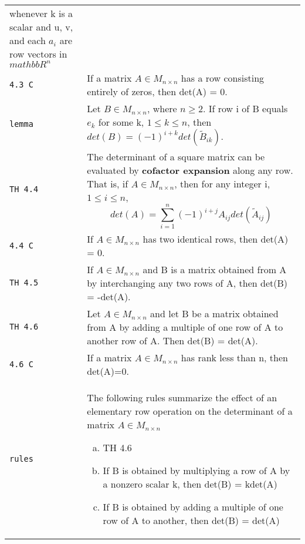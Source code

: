 \documentclass[10pt,landscape]{article}
\begin{document}
\begin{multicols}{3}
\begin{tabular}{@{}p{\the\MyLen}%
                @{}p{\linewidth-\the\MyLen}@{}}
\begin{equation*}
               \end{equation*}
               whenever k is a scalar and u, v, and each $a_i$ are row vectors in $mathbb{R}^n$\\
\verb!4.3 C! & If a matrix $A\in M_{n\!\times\! n}$ has a row consisting entirely of zeros, then det(A) = 0.\\
\verb!lemma! & Let $B\in M_{n\!\times\! n}$, where $n\geq 2$. If row i of B equals $e_k$ for some k, $1\leq k \leq n$, then $det(B) = (-1)^{i+k} det(\tilde{B}_{ik})$.\\
\verb!TH 4.4! & The determinant of a square matrix can be evaluated by \textbf{cofactor expansion} along any row. That is, if $A\in M_{n\!\times\! n}$, then for any integer i, 
               $1\leq i\leq n$,
               \begin{equation*}
               det(A) = \sum_{i=1}^n (-1)^{i+j} A_{ij} det(\tilde{A}_{ij})
               \end{equation*}\\
\verb!4.4 C! & If $A\in M_{n\!\times\!n}$ has two identical rows, then det(A) = 0.\\
\verb!TH 4.5! & If $A\in M_{n\!\times\! n}$ and B is a matrix obtained from A by interchanging any two rows of A, then det(B) = -det(A).\\
\verb!TH 4.6! & Let $A\in M_{n\!\times\! n}$ and let B be a matrix obtained from A by adding a multiple of one row of A to another row of A. Then det(B) = det(A).\\
\verb!4.6 C! & If a matrix $A\in M_{n\!\times\! n}$ has rank less than n, then det(A)=0.\\
\verb!rules! & The following rules summarize the effect of an elementary row operation on the determinant of a matrix $A\in M_{n\!\times\! n}$
              \begin{enumerate}[a)]
              \item TH 4.6
              \item If B is obtained by multiplying a row of A by a nonzero scalar k, then det(B) = kdet(A)
              \item If B is obtained by adding a multiple of one row of A to another, then det(B) = det(A)
              \end{enumerate}
\end{tabular}

\end{multicols}
\end{document}
